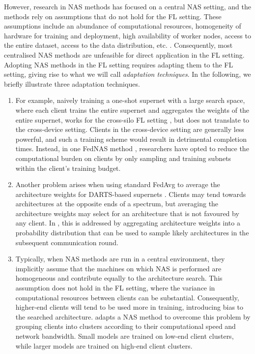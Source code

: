 % 

However, research in NAS methods has focused on a central NAS setting, and the methods rely on assumptions that do not hold for the FL setting. These assumptions include an abundance of computational resources, homogeneity of hardware for training and deployment, high availability of worker nodes, access to the entire dataset, access to the data distribution, etc. \cite{fl_advances_and_open_problems_2021}. Consequently, most centralised NAS methods are unfeasible for direct application in the FL setting. Adopting NAS methods in the FL setting requires adapting them to the FL setting, giving rise to what we will call \textit{adaptation techniques}. In the following, we briefly illustrate three adaptation techniques. 

\begin{enumerate}
    \item For example, naively training a one-shot supernet with a large search space, where each client trains the entire supernet and aggregates the weights of the entire supernet, works for the cross-silo FL setting \cite{fednas_2021}, but does not translate to the cross-device setting. Clients in the cross-device setting are generally less powerful, and such a training scheme would result in detrimental completion times. Instead, in one FedNAS method \cite{fedoras_2022}, researchers have opted to reduce the computational burden on clients by only sampling and training subnets within the client's training budget.
    \item Another problem arises when using standard FedAvg to average the architecture weights for DARTS-based supernets \cite{darts_2019}. Clients may tend towards architectures at the opposite ends of a spectrum, but averaging the architecture weights may select for an architecture that is not favoured by any client. In \cite{efnas_2024}, this is addressed by aggregating architecture weights into a probability distribution that can be used to sample likely architectures in the subsequent communication round.
    \item Typically, when NAS methods are run in a central environment, they implicitly assume that the machines on which NAS is performed are homogeneous and contribute equally to the architecture search. This assumption does not hold in the FL setting, where the variance in computational resources between clients can be substantial. Consequently, higher-end clients will tend to be used more in training, introducing bias to the searched architecture. \cite{network_aware_fed_nas_2025} adapts a NAS method to overcome this problem by grouping clients into clusters according to their computational speed and network bandwidth. Small models are trained on low-end client clusters, while larger models are trained on high-end client clusters.
\end{enumerate}


